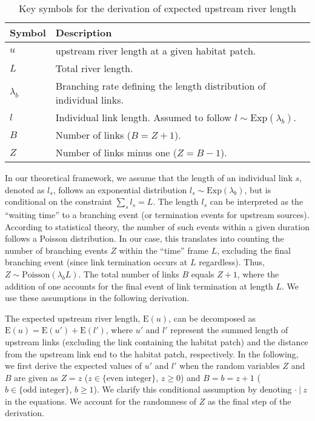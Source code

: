 \documentclass[11pt, class=article, crop=false]{standalone}
\begin{document}
\begin{table}
    \centering
    \caption{Key symbols for the derivation of expected upstream river length}
    \begin{tabularx}{\textwidth}{ll}
        Symbol & Description\\
        \hline
        $u$ & upstream river length at a given habitat patch.\\
        $L$ & Total river length.\\
        $\lambda_b$ & Branching rate defining the length distribution of individual links.\\
        $l$ & Individual link length. Assumed to follow $l \sim \mbox{Exp}(\lambda_b)$.\\
        $B$ & Number of links ($B = Z + 1$).\\
        $Z$ & Number of links minus one ($Z = B - 1$).\\
        \hline
    \end{tabularx}
    \label{tab:key-symbol}
\end{table}

In our theoretical framework, we assume that the length of an individual link $s$, denoted as $l_s$, follows an exponential distribution $l_s \sim \mbox{Exp}(\lambda_b)$, but is conditional on the constraint $\sum_s l_s = L$.
The length $l_s$ can be interpreted as the ``waiting time'' to a branching event (or termination events for upstream sources).
According to statistical theory, the number of such events within a given duration follows a Poisson distribution.
In our case, this translates into counting the number of branching events $Z$ within the ``time'' frame $L$, excluding the final branching event (since link termination occurs at $L$ regardless).
Thus, $Z \sim \mbox{Poisson}(\lambda_b L)$.
The total number of links $B$ equals $Z + 1$, where the addition of one accounts for the final event of link termination at length $L$.
We use these assumptions in the following derivation.

The expected upstream river length, $\mbox{E}(u)$, can be decomposed as $\mbox{E}(u) = \mbox{E}(u') + \mbox{E}(l')$, where $u'$ and $l'$ represent the summed length of upstream links (excluding the link containing the habitat patch) and the distance from the upstream link end to the habitat patch, respectively.
In the following, we first derive the expected values of $u'$ and $l'$ when the random variables $Z$ and $B$ are given as $Z = z$ ($z \in \{\text{even integer}\}$, $z \ge 0$) and $B = b = z + 1$ ($b \in \{\text{odd integer}\}$, $b \ge 1$).
We clarify this conditional assumption by denoting $\cdot ~|~ z$ in the equations.
We account for the randomness of $Z$ as the final step of the derivation.
\end{document}
